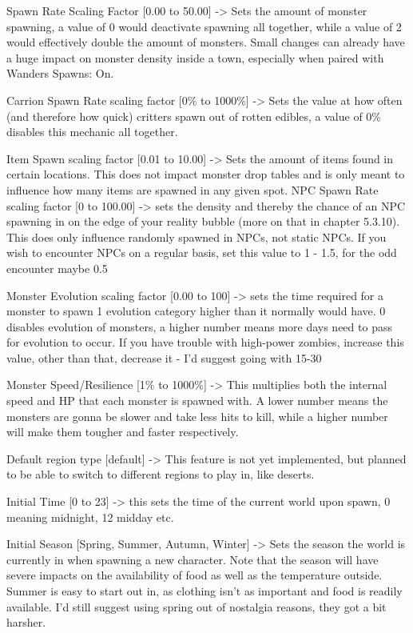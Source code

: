 Spawn Rate Scaling Factor [0.00 to 50.00] -> Sets the amount of monster spawning, a value of 0 would deactivate spawning all together, while a value of 2 would effectively double the amount of monsters. Small changes can already have a huge impact on monster density inside a town, especially when paired with Wanders Spawns: On.

Carrion Spawn Rate scaling factor [0\% to 1000\%] -> Sets the value at how often (and therefore how quick) critters spawn out of rotten edibles, a value of 0\% disables this mechanic all together.

Item Spawn scaling factor [0.01 to 10.00] -> Sets the amount of items found in certain locations. This does not impact monster drop tables and is only meant to influence how many items are spawned in any given spot.
NPC Spawn Rate scaling factor [0 to 100.00] -> sets the density and thereby the chance of an NPC spawning in on the edge of your reality bubble (more on that in chapter 5.3.10). This does only influence randomly spawned in NPCs, not static NPCs. If you wish to encounter NPCs on a regular basis, set this value to 1 - 1.5, for the odd encounter maybe 0.5

Monster Evolution scaling factor [0.00 to 100] -> sets the time required for a monster to spawn 1 evolution category higher than it normally would have. 0 disables evolution of monsters, a higher number means more days need to pass for evolution to occur. If you have trouble with high-power zombies, increase this value, other than that, decrease it - I'd suggest going with 15-30

Monster Speed/Resilience [1\% to 1000\%] -> This multiplies both the internal speed and HP that each monster is spawned with. A lower number means the monsters are gonna be slower and take less hits to kill, while a higher number will make them tougher and faster respectively.

Default region type [default] -> This feature is not yet implemented, but planned to be able to switch to different regions to play in, like deserts.

Initial Time [0 to 23] -> this sets the time of the current world upon spawn, 0 meaning midnight, 12 midday etc.

Initial Season [Spring, Summer, Autumn, Winter] -> Sets the season the world is currently in when spawning a new character. Note that the season will have severe impacts on the availability of food as well as the temperature outside. Summer is easy to start out in, as clothing isn't as important and food is readily available. I'd still suggest using spring out of nostalgia reasons, they got a bit harsher.

